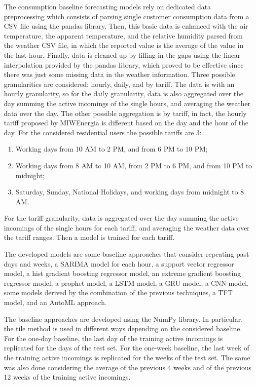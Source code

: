 The consumption baseline forecasting models rely on dedicated data preprocessing which consists of parsing single customer consumption data from a CSV file using the pandas library.
Then, this basic data is enhanced with the air temperature, the apparent temperature, and the relative humidity parsed from the weather CSV file, in which the reported value is the average of the value in the last hour.
Finally, data is cleaned up by filling in the gaps using the linear interpolation provided by the pandas library, which proved to be effective since there was just some missing data in the weather information.
Three possible granularities are considered: hourly, daily, and by tariff.
The data is with an hourly granularity, so for the daily granularity, data is also aggregated over the day summing the active incomings of the single hours, and averaging the weather data over the day.
The other possible aggregation is by tariff, in fact, the hourly tariff proposed by MIWEnergia is different based on the day and the hour of the day.
For the considered residential users the possible tariffs are 3:
\begin{enumerate}
  \item Working days from 10 AM to 2 PM, and from 6 PM to 10 PM;
  \item Working days from 8 AM to 10 AM, from 2 PM to 6 PM, and from 10 PM to midnight;
  \item Saturday, Sunday, National Holidays, and working days from midnight to 8 AM.
\end{enumerate}
For the tariff granularity, data is aggregated over the day summing the active incomings of the single hours for each tariff, and averaging the weather data over the tariff ranges.
Then a model is trained for each tariff.

The developed models are some baseline approaches that consider repeating past days and weeks, a SARIMA model for each hour, a support vector regressor model, a hist gradient boosting regressor model, an extreme gradient boosting regressor model, a prophet model, a LSTM model, a GRU model, a CNN model, some models derived by the combination of the previous techniques, a TFT model, and an AutoML approach.

The baseline approaches are developed using the NumPy library.
In particular, the tile method is used in different ways depending on the considered baseline.
For the one-day baseline, the last day of the training active incomings is replicated for the days of the test set.
For the one-week baseline, the last week of the training active incomings is replicated for the weeks of the test set.
The same was also done considering the average of the previous 4 weeks and of the previous 12 weeks of the training active incomings.

